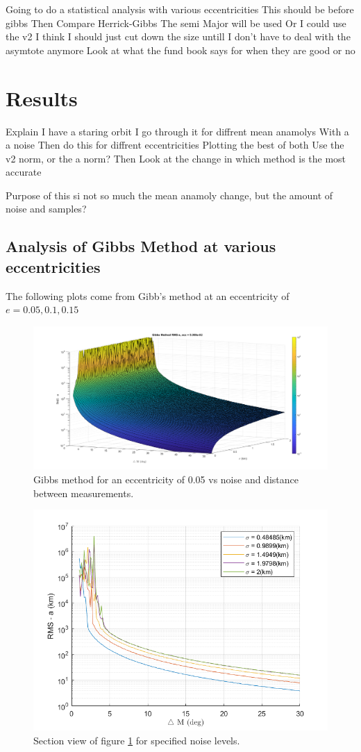 \documentclass[12pt]{article}
\begin{document}
	
	Going to do a statistical analysis with various eccentricities
	This should be before gibbs
	Then Compare Herrick-Gibbs
	The semi Major will be used
	Or I could use the v2
	I think I should just cut down the size untill I don't have to deal with the asymtote anymore
	Look at what the fund book says for when they are good or no
	
	\section{Results}
	Explain I have a staring orbit
	I go through it for diffrent mean anamolys
	With a a noise
	Then do this for diffrent eccentricities
	Plotting the best of both
	Use the v2 norm, or the a norm?
	Then Look at the change in which method is the most accurate
	
	Purpose of this si not so much the mean anamoly change, but the amount of noise and samples?
	\fi
	
	
	\subsection{Analysis of Gibbs Method at various eccentricities}
	The following plots come from Gibb's method at an eccentricity of $e=0.05,0.1,0.15$
	\begin{figure}[H]
		\centering
		\includegraphics[width=0.7\linewidth]{gibbs_e_05}
		\caption{Gibbs method for an eccentricity of 0.05 vs noise and distance between measurements.}
		\label{fig:gibbse05}
	\end{figure}

\begin{figure}[H]
	\centering
	\includegraphics[width=0.7\linewidth]{gibbs_e_05_side}
	\caption{Section view of figure \ref{fig:gibbse05} for specified noise levels.}
	\label{fig:Sidegibbse05}
\end{figure}
\end{document}
